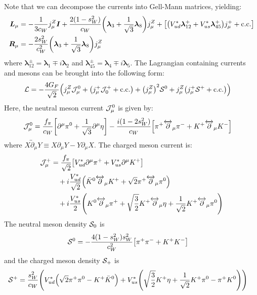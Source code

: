 Note that we can decompose the currents into Gell-Mann matrices, yielding:
\begin{align}
    \bm{L}_{\mu}
     & =
    -\frac{1}{3c_{W}}j^{Z}_{\mu}\bm{I}
    +\frac{2(1-s_{W}^{2})}{c_{W}}\qty(\bm{\lambda}_{3}+\frac{1}{\sqrt{3}}\bm{\lambda}_{8})j^{Z}_{\mu}
    +
    \qty[
    \qty(
    V^{*}_{ud}\bm{\lambda}^{+}_{12} + V^{*}_{us}\bm{\lambda}^{+}_{45}
    )j^{+}_{\mu}
    +\mathrm{c.c.}
    ]\notag \\
    \bm{R}_{\mu}
     & =
    -\frac{2s_{W}^{2}}{c_{W}^{2}}
    \qty(\bm{\lambda}_{3}+\frac{1}{\sqrt{3}}\bm{\lambda}_{8})j^{Z}_{\mu}
\end{align}
where \(\bm{\lambda}^{\pm}_{12} = \bm{\lambda}_{1} \mp i\bm{\lambda}_{2}\) and
\(\bm{\lambda}^{\pm}_{45} = \bm{\lambda}_{4} \mp i\bm{\lambda}_{5}\).
The Lagrangian containing currents and mesons can be brought into the following
form:
\begin{align}
    \mathcal{L} & =
    -\frac{4G_{F}}{\sqrt{2}}\qty(
    j^{Z}_{\mu}\mathcal{J}^{0}_{\mu}
    + \qty(j^{+}_{\mu}\mathcal{J}^{+}_{0} + \mathrm{c.c.})
    +\qty(j^{Z}_{\mu})^{2}\mathcal{S}^{0}
    +j^{Z}_{\mu}\qty(j^{+}_{\mu}\mathcal{S}^{+}+\mathrm{c.c.})
    )
\end{align}
Here, the neutral meson current \(\mathcal{J}^{0}_{\mu}\) is given by:
\begin{align}
    \mathcal{J}^{0}_{\mu} & =
    \frac{f_{\pi}}{c_{W}}\qty[
        \partial^{\mu}\pi^{0}
        + \frac{1}{\sqrt{3}}
        \partial^{\mu}\eta
    ]
    - \frac{i (1-2s_{W}^{2})}{c_{W}}
    \qty[
    \pi^{+}\overleftrightarrow{\partial}_{\mu}\pi^{-} +
    K^{+}\overleftrightarrow{\partial}_{\mu}K^{-}
    ]
\end{align}
where \(X\overleftrightarrow{\partial}_{\mu}Y \equiv X\partial_{\mu}Y - Y\partial_{\mu}X\).
The charged meson current is:
\begin{align}
    \mathcal{J}^{+}_{\mu}
     & =
    \frac{f_{\pi}}{\sqrt{2}}\qty[
    V^{*}_{ud}\partial^{\mu}\pi^{+}
    + V^{*}_{us}\partial^{\mu}K^{+}
    ]
    \\
     & \quad
    + i
    \frac{V^{*}_{ud}}{\sqrt{2}}\qty(
    \bar{K}^{0}\overleftrightarrow{\partial}_{\mu}K^{+}
    + \sqrt{2}\pi^{+}\overleftrightarrow{\partial}_{\mu}\pi^{0}
    )\notag  \\
     & \quad
    +i\frac{V_{us}^{*}}{2}\qty(
    K^{0}\overleftrightarrow{\partial}_{\mu}\pi^{+}
    +\sqrt{\frac{3}{2}}K^{+}\overleftrightarrow{\partial}_{\mu}\eta
    +\frac{1}{\sqrt{2}}K^{+}\overleftrightarrow{\partial}_{\mu}\pi^{0}
    )\notag
\end{align}
The neutral meson density \(\mathcal{S}_{0}\) is
\begin{align}
    \mathcal{S}^{0} & =
    - \frac{4(1-s_{W}^{2})s_{W}^{2}}{c_{W}^{2}}
    \qty[
    \pi^{+}\pi^{-} +
    K^{+}K^{-}
    ]
\end{align}
and the charged meson density \(\mathcal{S}_{+}\) is
\begin{align}
    \mathcal{S}^{+} & =
    \frac{s_{W}^{2}}{c_{W}}\qty(
    V^{*}_{ud}\qty(
    \sqrt{2}\pi^{+}\pi^{0}
    - K^{+}\bar{K}^{0}
    )
    +V^{*}_{us}\qty(
    \sqrt{\frac{3}{2}}K^{+}\eta
    + \frac{1}{\sqrt{2}}K^{+}\pi^{0}
    - \pi^{+}K^{0}
    )
    )
\end{align}
